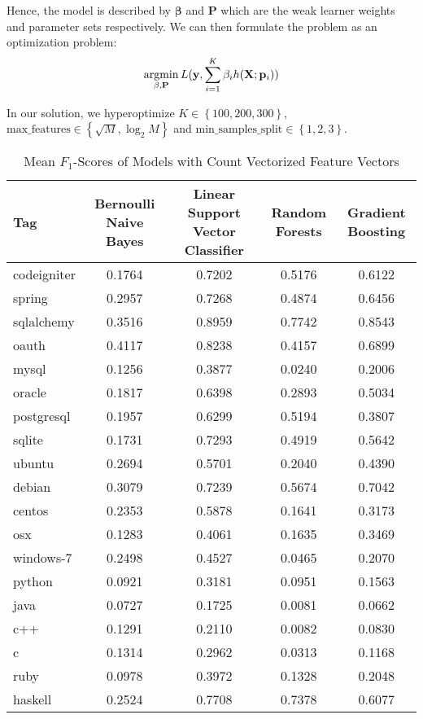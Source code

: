 \documentclass{sig-alternate}
\newcommand{\argmin}{\operatornamewithlimits{argmin}}
\renewcommand{\vec}[1]{\mathbf{#1}}
\begin{document}
	Hence, the model is described by $\vec{\beta}$ and $\vec{P}$ which are the
	weak learner weights and parameter sets respectively. We can then formulate
	the problem as an optimization problem:
	\[
		\argmin_{\vec{\beta}, \vec{P}} L(\vec{y}, \sum_{i=1}^K \beta_i h(\vec{X}; \vec{p}_i))
	\]

	In our solution, we hyperoptimize $K \in \left\{100, 200, 300\right\}$,
	$\text{max\_features} \in \left\{\sqrt{M}, \log_2{M}\right\}$ and
	$\text{min\_samples\_split} \in \left\{1, 2, 3\right\}$.


\begin{table*}
	\centering
	\begin{tabular}{|l|c|c|c|c|}
		\hline
		\textbf{Tag} & \textbf{Bernoulli Naive Bayes} & \textbf{Linear Support Vector Classifier} & \textbf{Random Forests} & \textbf{Gradient Boosting} \\\hline
		codeigniter	& 0.1764	& 0.7202	& 0.5176	& 0.6122 \\\hline
		spring		& 0.2957	& 0.7268	& 0.4874	& 0.6456 \\\hline
		sqlalchemy	& 0.3516	& 0.8959	& 0.7742	& 0.8543 \\\hline
		oauth		& 0.4117	& 0.8238	& 0.4157	& 0.6899 \\\hline
		mysql		& 0.1256	& 0.3877	& 0.0240	& 0.2006 \\\hline
		oracle		& 0.1817	& 0.6398	& 0.2893	& 0.5034 \\\hline
		postgresql	& 0.1957	& 0.6299	& 0.5194	& 0.3807 \\\hline
		sqlite		& 0.1731	& 0.7293	& 0.4919	& 0.5642 \\\hline
		ubuntu		& 0.2694	& 0.5701	& 0.2040	& 0.4390 \\\hline
		debian		& 0.3079	& 0.7239	& 0.5674	& 0.7042 \\\hline
		centos		& 0.2353	& 0.5878	& 0.1641	& 0.3173 \\\hline
		osx			& 0.1283	& 0.4061	& 0.1635	& 0.3469 \\\hline
		windows-7	& 0.2498	& 0.4527	& 0.0465	& 0.2070 \\\hline
		python		& 0.0921	& 0.3181	& 0.0951	& 0.1563 \\\hline
		java		& 0.0727	& 0.1725	& 0.0081	& 0.0662 \\\hline
		c++			& 0.1291	& 0.2110	& 0.0082	& 0.0830 \\\hline
		c			& 0.1314	& 0.2962	& 0.0313	& 0.1168 \\\hline
		ruby		& 0.0978	& 0.3972	& 0.1328	& 0.2048 \\\hline
		haskell		& 0.2524	& 0.7708	& 0.7378	& 0.6077 \\\hline
	\end{tabular}
	\caption{Mean $F_1$-Scores of Models with Count Vectorized Feature Vectors}
	\label{tab:tfidf_model_scores}
\end{table*}
\end{document}
